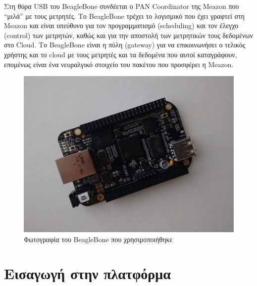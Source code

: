 \documentclass[12pt, a4paper, oneside]{report}
\begin{document}
Στη θύρα USB του BeagleBone συνδέεται ο PAN Coordinator της Meazon που ``μιλά'' με τους μετρητές. Το BeagleBone τρέχει το λογισμικό που έχει γραφτεί στη Meazon και είναι υπεύθυνο για τον προγραμματισμό (scheduling) και τον έλεγχο (control) των μετρητών, καθώς και για την αποστολή των μετρητικών τους δεδομένων στο Cloud.
Το BeagleBone είναι η πύλη (gateway) για να επικοινωνήσει ο τελικός χρήστης και το cloud με τους μετρητές και τα δεδομένα που αυτοί καταγράφουν, επομένως είναι ένα νευραλγικό στοιχείο του πακέτου που προσφέρει η Meazon.
\begin{figure}[!h]
\centering
\includegraphics[scale=0.54]{eikona_18}
\caption{Φωτογραφία του BeagleBone που χρησιμοποιήθηκε}
\end{figure}

\section{Εισαγωγή στην πλατφόρμα}
\end{document}

